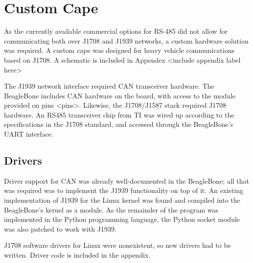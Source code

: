 \section{Custom Cape}

As the currently available commercial options for RS-485 did not allow for communicating both over J1708 and J1939 networks, a custom
hardware solution was required. A custom cape was designed for heavy vehicle communications based on J1708\cite{J1708}. A schematic is included in 
Appendex <include appendix label here>

The J1939 network interface required CAN transceiver hardware. The BeagleBone includes CAN hardware on the board, with access
to the module provided on pins <pins>. Likewise, the J1708/J1587 stack required J1708 hardware. An RS485 transceiver chip from TI
was wired up according to the specifications in the J1708 standard, and accessed through the BeagleBone's UART interface.

\subsection{Drivers}

Driver support for CAN was already well-documented in the BeagleBone; all that was required was to implement the J1939
functionality on top of it. An existing implementation of J1939 for the Linux kernel was found and compiled into
the BeagleBone's kernel as a module. As the remainder of the program was implemented in the Python programming language,
the Python socket module was also patched to work with J1939.

J1708 software drivers for Linux were nonexistent, so new drivers had to be written. Driver code is included in the
appendix.
